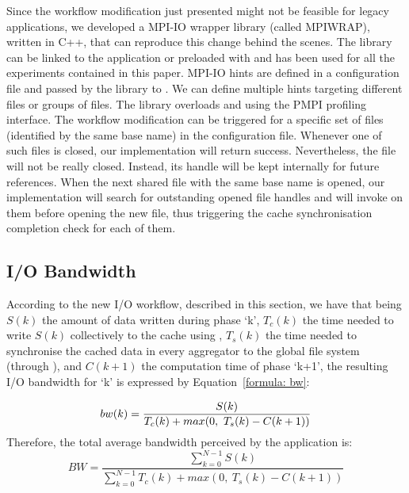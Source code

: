 Since the workflow modification just presented might not be feasible for legacy applications, we developed a MPI-IO wrapper library (called MPIWRAP), written in C++, that can reproduce this change behind the scenes. The library can be linked to the application or preloaded with  and has been used for all the experiments contained in this paper. MPI-IO hints are defined in a configuration file and passed by the library to . We can define multiple hints targeting different files or groups of files. The library overloads  and  using the PMPI profiling interface. The workflow modification can be triggered for a specific set of files (identified by the same base name) in the configuration file. Whenever one of such files is closed, our  implementation will return success. Nevertheless, the file will not be really closed. Instead, its handle will be kept internally for future references. When the next shared file with the same base name is opened, our  implementation will search for outstanding opened file handles and will invoke  on them before opening the new file, thus triggering the cache synchronisation completion check for each of them.

\subsection{I/O Bandwidth}
\label{subsec: bw-impr}
According to the new I/O workflow, described in this section, we have that being $S(k)$ the amount of data written during phase `k', $T_c(k)$ the time needed to write $S(k)$ collectively to the cache using , $T_s(k)$ the time needed to synchronise the cached data in every aggregator to the global file system (through ), and $C(k+1)$ the computation time of phase `k+1', the resulting I/O bandwidth for `k' is expressed by Equation~\ref{formula: bw}:

\begin{equation}\label{formula: bw}
        bw(k) = \frac{S(k)}{T_c(k) + max(0,\ T_s(k) - C(k+1))} \\
\end{equation}
Therefore, the total average bandwidth perceived by the application is:
\begin{equation}\label{formula: abw}
        BW = \frac{\sum_{k=0}^{N-1} S(k)}{\sum_{k=0}^{N-1} T_c(k) + max(0,\ T_s(k) - C(k+1))}
\end{equation}

